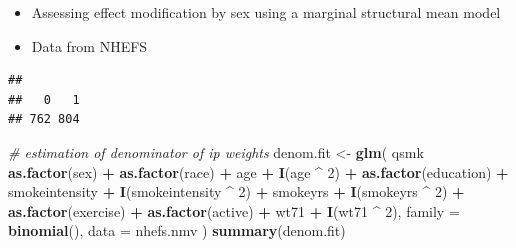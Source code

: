 \documentclass[
  10pt,
]{book}
\newenvironment{Shaded}{\begin{snugshade}}{\end{snugshade}}
\newcommand{\CommentTok}[1]{\textcolor[rgb]{0.56,0.35,0.01}{\textit{#1}}}
\newcommand{\DataTypeTok}[1]{\textcolor[rgb]{0.13,0.29,0.53}{#1}}
\newcommand{\DecValTok}[1]{\textcolor[rgb]{0.00,0.00,0.81}{#1}}
\newcommand{\KeywordTok}[1]{\textcolor[rgb]{0.13,0.29,0.53}{\textbf{#1}}}
\newcommand{\NormalTok}[1]{#1}
\newcommand{\OperatorTok}[1]{\textcolor[rgb]{0.81,0.36,0.00}{\textbf{#1}}}
\newcommand{\StringTok}[1]{\textcolor[rgb]{0.31,0.60,0.02}{#1}}
\providecommand{\tightlist}{%
  \setlength{\itemsep}{0pt}\setlength{\parskip}{0pt}}
\begin{document}
\begin{itemize}
\tightlist
\item
  Assessing effect modification by sex using a marginal structural mean model
\item
  Data from NHEFS
\end{itemize}

\begin{Shaded}
\end{Shaded}

\begin{verbatim}
## 
##   0   1 
## 762 804
\end{verbatim}

\begin{Shaded}
\begin{Highlighting}[]
\CommentTok{# estimation of denominator of ip weights}
\NormalTok{denom.fit <-}
\StringTok{  }\KeywordTok{glm}\NormalTok{(}
\NormalTok{    qsmk }\OperatorTok{~}\StringTok{ }\KeywordTok{as.factor}\NormalTok{(sex) }\OperatorTok{+}\StringTok{ }\KeywordTok{as.factor}\NormalTok{(race) }\OperatorTok{+}\StringTok{ }\NormalTok{age }\OperatorTok{+}\StringTok{ }\KeywordTok{I}\NormalTok{(age }\OperatorTok{^}\StringTok{ }\DecValTok{2}\NormalTok{) }\OperatorTok{+}
\StringTok{      }\KeywordTok{as.factor}\NormalTok{(education) }\OperatorTok{+}\StringTok{ }\NormalTok{smokeintensity }\OperatorTok{+}
\StringTok{      }\KeywordTok{I}\NormalTok{(smokeintensity }\OperatorTok{^}\StringTok{ }\DecValTok{2}\NormalTok{) }\OperatorTok{+}\StringTok{ }\NormalTok{smokeyrs }\OperatorTok{+}\StringTok{ }\KeywordTok{I}\NormalTok{(smokeyrs }\OperatorTok{^}\StringTok{ }\DecValTok{2}\NormalTok{) }\OperatorTok{+}
\StringTok{      }\KeywordTok{as.factor}\NormalTok{(exercise) }\OperatorTok{+}\StringTok{ }\KeywordTok{as.factor}\NormalTok{(active) }\OperatorTok{+}\StringTok{ }\NormalTok{wt71 }\OperatorTok{+}\StringTok{ }\KeywordTok{I}\NormalTok{(wt71 }\OperatorTok{^}\StringTok{ }\DecValTok{2}\NormalTok{),}
    \DataTypeTok{family =} \KeywordTok{binomial}\NormalTok{(),}
    \DataTypeTok{data =}\NormalTok{ nhefs.nmv}
\NormalTok{  )}
\KeywordTok{summary}\NormalTok{(denom.fit)}
\end{Highlighting}
\end{Shaded}
\end{document}
